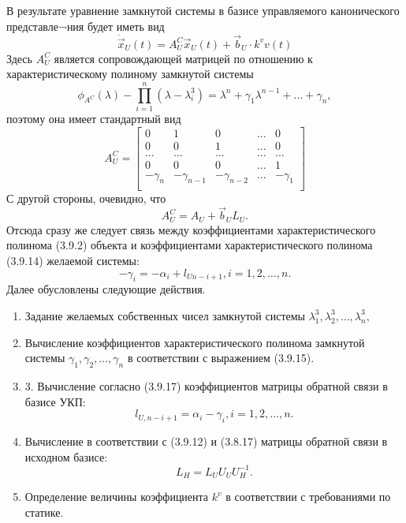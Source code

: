 В результате  уравнение замкнутой системы  в базисе управляемого канонического представле¬ния будет иметь вид
\begin{equation}
	\dot{\vec{x}}_U(t)=A_U^C\vec{x}_U(t)+\vec{b}_U \cdot k^vv(t)
\end{equation}
Здесь $A_U^C$ является сопровождающей матрицей по отношению к характеристическому полиному замкнутой системы
\begin{equation}
	\phi_{A^C}(\lambda) - \prod_{i=1}^{n}(\lambda - \lambda_i^3)=\lambda^n+\gamma_1\lambda^{n-1}+\dots+\gamma_n,
\end{equation}
поэтому она имеет стандартный вид
\begin{equation}
	A_U^C = 
	\begin{bmatrix}
	    0 & 1 & 0 & \dots & 0 \\
	    0 & 0 & 1 & \dots & 0 \\
	    \dots & \dots & \dots & \dots & \dots \\
	    0 & 0 & 0 & \dots & 1 \\
	    -\gamma_n &  -\gamma_{n-1} & -\gamma_{n-2} & \dots & -\gamma_1 \\
	\end{bmatrix}
\end{equation}
С другой стороны, очевидно, что
\begin{equation}
	A_U^C=A_U+\vec{b}_UL_U.
\end{equation}
Отсюда сразу же следует связь между коэффициентами характеристического полинома (3.9.2) объекта и коэффициентами характеристического полинома (3.9.14) желаемой системы:
\begin{equation}
	-\gamma_i=-\alpha_i+l_{Un-i+1}, i=1,2,\dots,n.
\end{equation}
Далее обусловлены следующие действия.
\begin{enumerate}
\renewcommand\labelenumi{\theenumi.}
\item Задание желаемых собственных чисел замкнутой системы $\lambda_1^3,\lambda_2^3,\dots,\lambda_n^3,$
\item Вычисление коэффициентов характеристического полинома замкнутой системы $\gamma_1,\gamma_2,\dots,\gamma_n$ в соответствии с выражением (3.9.15).
\item 3.	Вычисление согласно (3.9.17) коэффициентов матрицы обратной связи в базисе УКП:
\begin{equation}
	l_{U,n-i+1}=\alpha_i-\gamma_i, i=1,2,\dots,n.
\end{equation}
\item Вычисление в соответствии с (3.9.12) и (3.8.17) матрицы обратной связи в исходном базисе:
\begin{equation}
	L_H=L_UU_UU_H^{-1}.
\end{equation}
\item Определение величины коэффициента $k^v$ в соответствии с требованиями по статике.
\end{enumerate}

